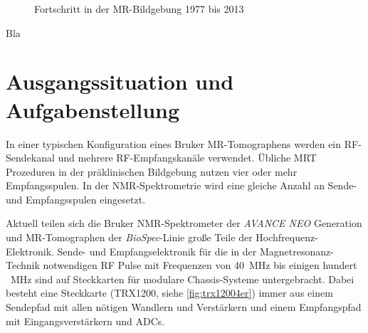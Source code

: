 \begin{figure}[H]
	\centering
	\hfill
	\caption{Fortschritt in der MR-Bildgebung 1977 bis 2013}
	\label{fig:fortschritt}
\end{figure}

Bla

 
\section{Ausgangssituation und Aufgabenstellung}
In einer typischen Konfiguration eines Bruker MR-Tomographens werden ein RF-Sendekanal und mehrere RF-Empfangskanäle verwendet. Übliche MRT Prozeduren in der präklinischen Bildgebung nutzen vier oder mehr Empfangsspulen. In der NMR-Spektrometrie wird eine gleiche Anzahl an Sende- und Empfangsspulen eingesetzt.

Aktuell teilen sich die Bruker NMR-Spektrometer der \textit{AVANCE NEO} Generation und MR-Tomographen der \textit{BioSpec}-Linie große Teile der Hochfrequenz-Elektronik. Sende- und Empfangselektronik für die in der Magnetresonanz-Technik notwendigen RF Pulse mit Frequenzen von \SI{40}{\mega\hertz} bis einigen hundert \SI{}{\mega\hertz} sind auf Steckkarten für modulare Chassis-Systeme untergebracht. Dabei besteht eine Steckkarte (TRX1200, siehe \autoref{fig:trx12004er}) immer aus einem Sendepfad mit allen nötigen Wandlern und Verstärkern und einem Empfangspfad mit Eingangsverstärkern und ADCs.

